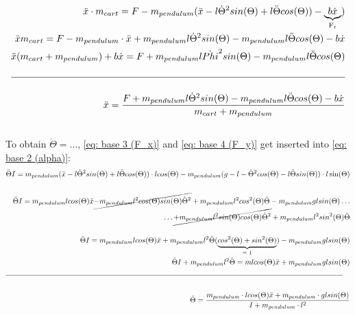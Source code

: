    \begin{align}\label{eq: final eq for x ddot}
        \ddot{x} \cdot m_{cart} = F-m_{pendulum}(\ddot{x}-l\dot{\Theta}^2 sin(\Theta)+l \ddot{\Theta} cos (\Theta))-\underbrace{b\dot{x}}_\text{F\textsubscript{r}})\notag \\
         \ddot{x} m_{cart} = F-m_{pendulum}\cdot\ddot{x}+m_{pendulum}l\dot{\Theta}^2 sin(\Theta)-m_{pendulum}l\ddot{\Theta}cos(\Theta)-b\dot{x}\notag \\
         \ddot{x}(m_{cart}+m_{pendulum})+b\dot{x}=F+m_{pendulum}l\dot{Phi}^2 sin(\Theta)-m_{pendulum}l\ddot{\Theta}cos(\Theta)\notag \\\notag \\\hline \notag \\
         \ddot{x} = \frac{F+m_{pendulum}l\dot{\Theta}^2 sin(\Theta)-m_{pendulum}l\ddot{\Theta}cos(\Theta)-b\dot{x}}{m_{cart}+m_{pendulum}}
    \end{align}
    \\
    To obtain $\ddot{\Theta} = \dots$, \autoref{eq: base 3 (F_x)} and \autoref{eq: base 4 (F_y)} get inserted into \autoref{eq: base 2 (alpha)}:
    \begin{align} \label{eq: final eq for Phi ddot}
        \ddot{\Theta} I = m_{pendulum} (\ddot{x} - l\dot{\Theta}^2 sin(\Theta) + l\ddot{\Theta} cos(\Theta))\cdot lcos(\Theta)-m_{pendulum}(g-l-\dot{\Theta}^2 cos(\Theta)-l\ddot{\Theta}sin(\Theta))\cdot l\sin(\Theta)\notag \\\notag\\
        \ddot{\Theta} I = m_{pendulum} l cos(\Theta) \ddot{x} \cancel{- m_{pendulum} l^2 cos(\Theta) sin(\Theta) \dot{\Theta}^2} + m_{pendulum} l^2 cos^2(\Theta) \ddot{\Theta} - m_{pendulum}g l sin(\Theta) \dots \notag\\ \dots \cancel{+m_{pendulum}l^2 sin(\Theta)cos(\Theta)\dot{\Theta}^2}+m_{pendulum}l^2 sin^2(\Theta)\ddot{\Theta}\notag \\\notag \\
        \ddot{\Theta} I = m_{pendulum} l cos(\Theta) \ddot{x} + m_{pendulum} l^2 \ddot{\Theta} (\underbrace{cos^2(\Theta)+sin^2(\Theta)}_\text{= 1})-m_{pendulum} g l sin(\Theta)\notag \\
         \ddot{\Theta} I + m_{pendulum}l^2\ddot{\Theta} = m l cos(\Theta)\ddot{x} + m_{pendulum} g l sin(\Theta)\notag \\\cline{1-2}\notag \\
         \ddot{\Theta} = \frac{m_{pendulum}\cdot lcos(\Theta)\ddot{x}+m_{pendulum}\cdot glsin(\Theta)}{I+m_{pendulum}\cdot l^2}
    \end{align}
\newpage
